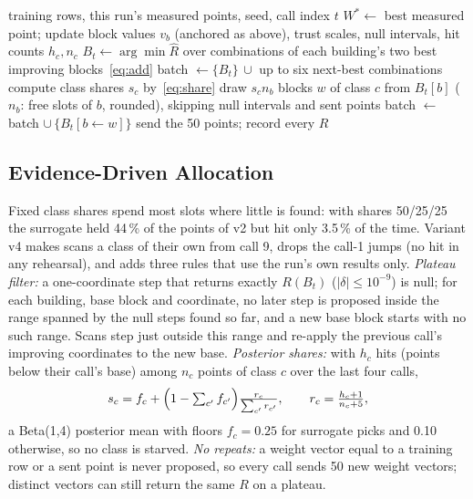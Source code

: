\begin{algorithm}[t]
\caption{One call of the policy (v4)}
\label{alg:call}
\small
\begin{algorithmic}[1]
\Require training rows, this run's measured points, seed, call index $t$
\State $W^\ast\gets$ best measured point; update block values $v_b$ (anchored as above), trust scales, null intervals, hit counts $h_c,n_c$
\State $B_t\gets\arg\min\hat R$ over combinations of each building's two best improving blocks~\eqref{eq:add}
\State batch $\gets\{B_t\}\,\cup$ up to six next-best combinations
\State compute class shares $s_c$ by~\eqref{eq:share}
\State draw $s_c n_b$ blocks $w$ of class $c$ from $B_t[b]$ ($n_b$: free slots of $b$, rounded), skipping null intervals and sent points
\State batch $\gets$ batch $\cup\,\{B_t[b\!\leftarrow\!w]\}$
\EndFor
\State send the 50 points; record every $R$ 
\end{algorithmic}
\end{algorithm}

\subsection{Evidence-Driven Allocation}
\label{sec:alloc}
Fixed class shares spend most slots where little is found: with shares 50/25/25 the surrogate held 44\,\% of the
points of v2 but hit only 3.5\,\% of the time. Variant v4 makes scans a class of their own from call 9, drops the
call-1 jumps (no hit in any rehearsal), and adds three rules that use the run's own results only.
\emph{Plateau filter:} a one-coordinate step that returns exactly $R(B_t)$ ($|\delta|\le10^{-9}$) is null; for each
building, base block and coordinate, no later step is proposed inside the range spanned by the null steps found so
far, and a new base block starts with no such range. Scans step just outside this range and re-apply the previous
call's improving coordinates to the new base.
\emph{Posterior shares:} with $h_c$ hits (points below their call's base) among $n_c$ points of class $c$ over the last
four calls,
\begin{equation}
s_c=f_c+\Bigl(1-\textstyle\sum_{c'}f_{c'}\Bigr)\frac{r_c}{\sum_{c'}r_{c'}},\qquad r_c=\frac{h_c+1}{n_c+5},
\label{eq:share}
\end{equation}
a Beta(1,4) posterior mean with floors $f_c=0.25$ for surrogate picks and 0.10 otherwise, so no class is starved.
\emph{No repeats:} a weight vector equal to a training row or a sent point is never proposed, so every call sends 50
new weight vectors; distinct vectors can still return the same $R$ on a plateau.

